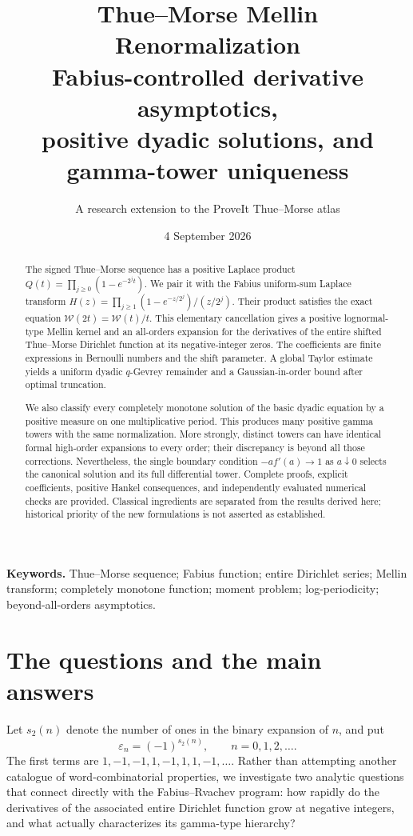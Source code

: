 \documentclass[11pt,letterpaper]{article}
\title{\vspace{-1em}\textbf{Thue--Morse Mellin Renormalization}\\[0.35em]
\Large Fabius-controlled derivative asymptotics,\\
positive dyadic solutions, and gamma-tower uniqueness}
\author{A research extension to the ProveIt Thue--Morse atlas}
\date{4 September 2026}
\numberwithin{equation}{section}
\theoremstyle{definition}
\theoremstyle{remark}
\newcommand{\W}{\mathcal W}
\newcommand{\eps}{\varepsilon}
\begin{document}
\maketitle
\thispagestyle{empty}
\begin{abstract}
The signed Thue--Morse sequence has a positive Laplace product
$Q(t)=\prod_{j\ge0}(1-e^{-2^jt})$. We pair it with the Fabius uniform-sum
Laplace transform
$H(z)=\prod_{j\ge1}(1-e^{-z/2^j})/(z/2^j)$.
Their product satisfies the exact equation $\W(2t)=\W(t)/t$.
This elementary cancellation gives a positive lognormal-type Mellin kernel
and an all-orders expansion for the derivatives of the entire shifted
Thue--Morse Dirichlet function at its negative-integer zeros.
The coefficients are finite expressions in Bernoulli numbers and the shift
parameter. A global Taylor estimate yields a uniform dyadic
$q$-Gevrey remainder and a Gaussian-in-order bound after optimal truncation.

We also classify every completely monotone solution of the basic dyadic
equation by a positive measure on one multiplicative period. This produces
many positive gamma towers with the same normalization. More strongly,
distinct towers can have identical formal high-order expansions to every
order; their discrepancy is beyond all those corrections. Nevertheless,
the single boundary condition $-a f'(a)\to1$ as $a\downarrow0$ selects the
canonical solution and its full differential tower.
Complete proofs, explicit coefficients, positive Hankel consequences, and
independently evaluated numerical checks are provided. Classical ingredients
are separated from the results derived here; historical priority of the
new formulations is not asserted as established.
\end{abstract}
\vspace{0.35em}
\noindent\textbf{Keywords.} Thue--Morse sequence; Fabius function; entire Dirichlet
series; Mellin transform; completely monotone function; moment problem;
log-periodicity; beyond-all-orders asymptotics.

\clearpage
{\linespread{0.94}\small\setlength{\parskip}{0pt}\tableofcontents}
\clearpage

\section{The questions and the main answers}\label{sec:intro}

Let $s_2(n)$ denote the number of ones in the binary expansion of $n$, and put
\begin{equation}\label{eq:epsilon}
 \eps_n=(-1)^{s_2(n)},\qquad n=0,1,2,\ldots.
\end{equation}
The first terms are $1,-1,-1,1,-1,1,1,-1,\ldots$.
Rather than attempting another catalogue of word-combinatorial properties,
we investigate two analytic questions that connect directly with the
Fabius--Rvachev program: how rapidly do the derivatives of the associated
entire Dirichlet function grow at negative integers, and what actually
characterizes its gamma-type hierarchy?
\end{document}
